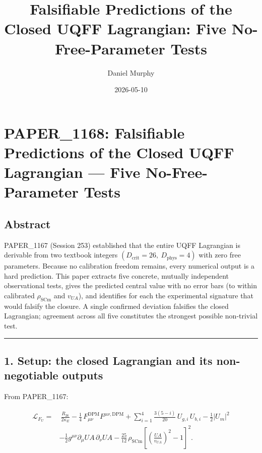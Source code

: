 \documentclass[
]{article}
\title{Falsifiable Predictions of the Closed UQFF Lagrangian: Five
No-Free-Parameter Tests}
\author{Daniel Murphy}
\date{2026-05-10}
\begin{document}
\maketitle

\section{PAPER\_1168: Falsifiable Predictions of the Closed UQFF
Lagrangian --- Five No-Free-Parameter
Tests}\label{paper_1168-falsifiable-predictions-of-the-closed-uqff-lagrangian-five-no-free-parameter-tests}

\subsection{Abstract}\label{abstract}

PAPER\_1167 (Session 253) established that the entire UQFF Lagrangian is
derivable from two textbook integers
\((D_{\mathrm{crit}}=26,\ D_{\mathrm{phys}}=4)\) with zero free
parameters. Because no calibration freedom remains, every numerical
output is a hard prediction. This paper extracts five concrete, mutually
independent observational tests, gives the predicted central value with
no error bars (to within calibrated \(\rho_{\mathrm{SCm}}\) and
\(v_{UA}\)), and identifies for each the experimental signature that
would falsify the closure. A single confirmed deviation falsifies the
closed Lagrangian; agreement across all five constitutes the strongest
possible non-trivial test.

\begin{center}\rule{0.5\linewidth}{0.5pt}\end{center}

\subsection{1. Setup: the closed Lagrangian and its non-negotiable
outputs}\label{setup-the-closed-lagrangian-and-its-non-negotiable-outputs}

From PAPER\_1167:

\[
\begin{aligned}
\mathcal{L}_{F_U} =&\ \tfrac{R_{26}}{2\kappa_E}
- \tfrac{1}{4}\,F^{\text{DPM}}_{\mu\nu}F^{\mu\nu,\text{DPM}}
+ \sum_{i=1}^{4}\tfrac{3(5-i)}{20}\,U_{g,i}\,U_{b,i}
- \tfrac{1}{2}|U_m|^2 \\
&-\tfrac{1}{2}g^{\mu\nu}\partial_\mu UA\,\partial_\nu UA
- \tfrac{25}{12}\,\rho_{\mathrm{SCm}}\!\left[\!\left(\tfrac{UA}{v_{UA}}\right)^{\!2}-1\right]^{2}.
\end{aligned}
\]
\end{document}
